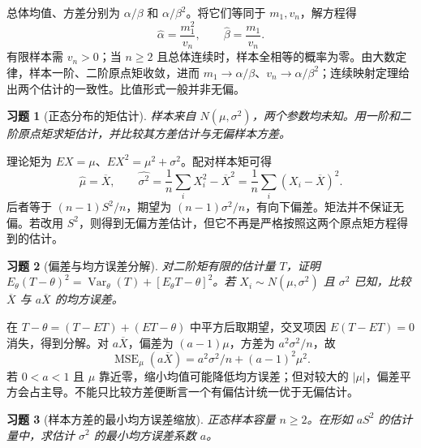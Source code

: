 \documentclass[UTF8,12pt,a4paper,fontset=fandol]{ctexart}
\newtheorem{exercise}{习题}[section]
\begin{document}
\begin{solve}\label{a:B9.3}总体均值、方差分别为 $\alpha/\beta$ 和 $\alpha/\beta^2$。将它们等同于 $m_1,v_n$，解方程得\[\widehat\alpha=\frac{m_1^2}{v_n},\qquad\widehat\beta=\frac{m_1}{v_n}.\]有限样本需 $v_n>0$；当 $n\ge2$ 且总体连续时，样本全相等的概率为零。由大数定律，样本一阶、二阶原点矩收敛，进而 $m_1\to\alpha/\beta$、$v_n\to\alpha/\beta^2$；连续映射定理给出两个估计的一致性。比值形式一般并非无偏。\end{solve}

\begin{exercise}[正态分布的矩估计]\label{q:B9.4}
样本来自 $N(\mu,\sigma^2)$，两个参数均未知。用一阶和二阶原点矩求矩估计，并比较其方差估计与无偏样本方差。\par{}
\end{exercise}

\begin{solve}\label{a:B9.4}理论矩为 $EX=\mu$、$EX^2=\mu^2+\sigma^2$。配对样本矩可得\[\widehat\mu=\overline X,\qquad\widehat{\sigma^2}=\frac1n\sum_iX_i^2-\overline X^2=\frac1n\sum_i(X_i-\overline X)^2.\]后者等于 $(n-1)S^2/n$，期望为 $(n-1)\sigma^2/n$，有向下偏差。矩法并不保证无偏。若改用 $S^2$，则得到无偏方差估计，但它不再是严格按照这两个原点矩方程得到的估计。\end{solve}

\begin{exercise}[偏差与均方误差分解]\label{q:B9.5}
对二阶矩有限的估计量 $T$，证明 $E_\theta(T-\theta)^2=\operatorname{Var}_\theta(T)+[E_\theta T-\theta]^2$。若 $X_i\sim N(\mu,\sigma^2)$ 且 $\sigma^2$ 已知，比较 $\overline X$ 与 $a\overline X$ 的均方误差。\par{}
\end{exercise}

\begin{solve}\label{a:B9.5}在 $T-\theta=(T-ET)+(ET-\theta)$ 中平方后取期望，交叉项因 $E(T-ET)=0$ 消失，得到分解。对 $a\overline X$，偏差为 $(a-1)\mu$，方差为 $a^2\sigma^2/n$，故\[\operatorname{MSE}_\mu(a\overline X)=a^2\sigma^2/n+(a-1)^2\mu^2.\]若 $0<a<1$ 且 $\mu$ 靠近零，缩小均值可能降低均方误差；但对较大的 $|\mu|$，偏差平方会占主导。不能只比较方差便断言一个有偏估计统一优于无偏估计。\end{solve}

\begin{exercise}[样本方差的最小均方误差缩放]\label{q:B9.6}
正态样本容量 $n\ge2$。在形如 $aS^2$ 的估计量中，求估计 $\sigma^2$ 的最小均方误差系数 $a$。\par{}
\end{exercise}
\end{document}
